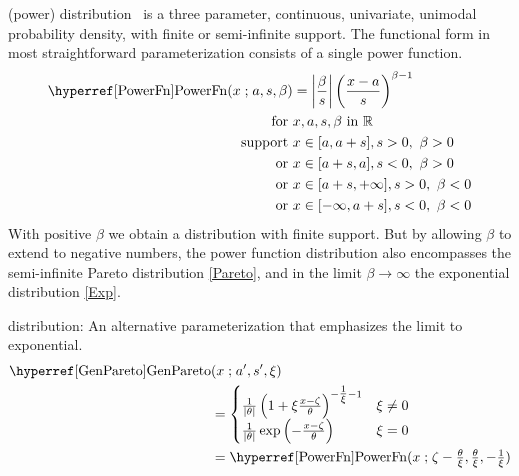 



\label{sec:PowerFn}


 (power) distribution~\cite{Pearson1916, Meniconi1996,Johnson1995} 
is  a three parameter, continuous, univariate, unimodal probability density, with finite or semi-infinite support. The functional form in most straightforward  parameterization consists of a single power function.
\begin{align}
\label{PowerFn}
\opr{PowerFn}(x\given a,s,\beta) &= 
\left|\frac{\beta}{ s}\right|
\left(\frac{x-a}{s} \right)^{\beta -1} \checked
\\
\notag  \text{for } & x, a, s, \beta \text{ in } \mathbb{R}
 \\ \text{ support } & x \in [a,a+s], s>0,\ \beta>0 \notag \checked
  \\ \text{ or } &  x\in[a+s,a], s<0,\ \beta>0  \checked
 \notag 
 \\  \notag  \text{ or } &  x\in[a+s,+\infty], s>0,\ \beta<0 \checked
 \\  \notag  \text{ or } &  x\in[-\infty,a+s], s<0,\ \beta<0 \checked
 \notag
\end{align}
%
With positive $\beta$ we obtain a distribution with finite support. But by allowing $\beta$ to extend to negative numbers, the power function distribution also encompasses the semi-infinite Pareto distribution \eqref{Pareto}, and in the limit $\beta\rightarrow\infty$ the exponential distribution \eqref{Exp}.



 distribution: An alternative parameterization that emphasizes the limit to exponential.
\begin{align}
\label{GenPareto}
\opr{GenPareto}&(x\given a',s',\xi) 
\\ & =
 \begin{cases}
  \frac{1}{|\theta|}\left( 1 + \xi \frac{x-\pLoc}{\theta}\right)^{-\tfrac{1}{\xi}-1} & \xi \neq 0 \checked
\notag
\\ 
 \frac{1}{|\theta|} \exp \left(-\frac{x-\pLoc}{\theta} \right)& \xi = 0 \checked
\notag
\end{cases}
\\
& = \opr{PowerFn}(x\given \pLoc-\tfrac{\theta}{\xi},\tfrac{\theta}{\xi},  -\tfrac{1}{\xi}) \checked
\notag
\end{align}


